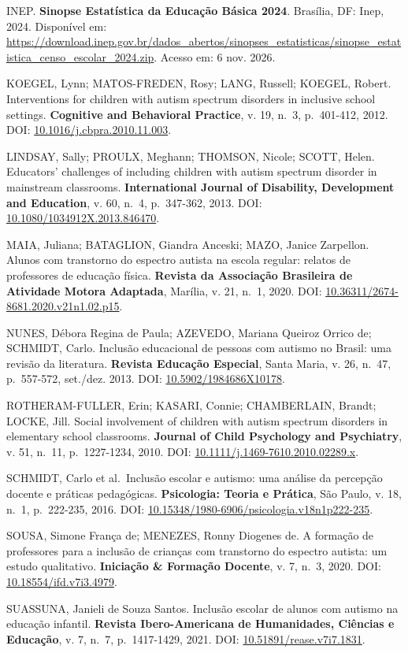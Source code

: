 INEP. \textbf{Sinopse Estatística da Educação Básica 2024}. Brasília,
DF: Inep, 2024. Disponível em:
\url{https://download.inep.gov.br/dados_abertos/sinopses_estatisticas/sinopse_estatistica_censo_escolar_2024.zip}.
Acesso em: 6 nov. 2026.

KOEGEL, Lynn; MATOS-FREDEN, Rosy; LANG, Russell; KOEGEL, Robert.
Interventions for children with autism spectrum disorders in inclusive
school settings. \textbf{Cognitive and Behavioral Practice}, v. 19,
n.~3, p.~401-412, 2012. DOI: \url{10.1016/j.cbpra.2010.11.003}.

LINDSAY, Sally; PROULX, Meghann; THOMSON, Nicole; SCOTT, Helen.
Educators' challenges of including children with autism spectrum
disorder in mainstream classrooms. \textbf{International Journal of
Disability, Development and Education}, v. 60, n.~4, p.~347-362, 2013.
DOI: \url{10.1080/1034912X.2013.846470}.

MAIA, Juliana; BATAGLION, Giandra Anceski; MAZO, Janice Zarpellon.
Alunos com transtorno do espectro autista na escola regular: relatos de
professores de educação física. \textbf{Revista da Associação Brasileira
de Atividade Motora Adaptada}, Marília, v. 21, n.~1, 2020. DOI:
\url{10.36311/2674-8681.2020.v21n1.02.p15}.

NUNES, Débora Regina de Paula; AZEVEDO, Mariana Queiroz Orrico de;
SCHMIDT, Carlo. Inclusão educacional de pessoas com autismo no Brasil:
uma revisão da literatura. \textbf{Revista Educação Especial}, Santa
Maria, v. 26, n.~47, p.~557-572, set./dez. 2013. DOI:
\url{10.5902/1984686X10178}.

ROTHERAM-FULLER, Erin; KASARI, Connie; CHAMBERLAIN, Brandt; LOCKE, Jill.
Social involvement of children with autism spectrum disorders in
elementary school classrooms. \textbf{Journal of Child Psychology and
Psychiatry}, v. 51, n.~11, p.~1227-1234, 2010. DOI:
\url{10.1111/j.1469-7610.2010.02289.x}.

SCHMIDT, Carlo et al.~Inclusão escolar e autismo: uma análise da
percepção docente e práticas pedagógicas. \textbf{Psicologia: Teoria e
Prática}, São Paulo, v. 18, n.~1, p.~222-235, 2016. DOI:
\url{10.15348/1980-6906/psicologia.v18n1p222-235}.

SOUSA, Simone França de; MENEZES, Ronny Diogenes de. A formação de
professores para a inclusão de crianças com transtorno do espectro
autista: um estudo qualitativo. \textbf{Iniciação \& Formação Docente},
v. 7, n.~3, 2020. DOI: \url{10.18554/ifd.v7i3.4979}.

SUASSUNA, Janieli de Souza Santos. Inclusão escolar de alunos com
autismo na educação infantil. \textbf{Revista Ibero-Americana de
Humanidades, Ciências e Educação}, v. 7, n.~7, p.~1417-1429, 2021. DOI:
\url{10.51891/rease.v7i7.1831}.

